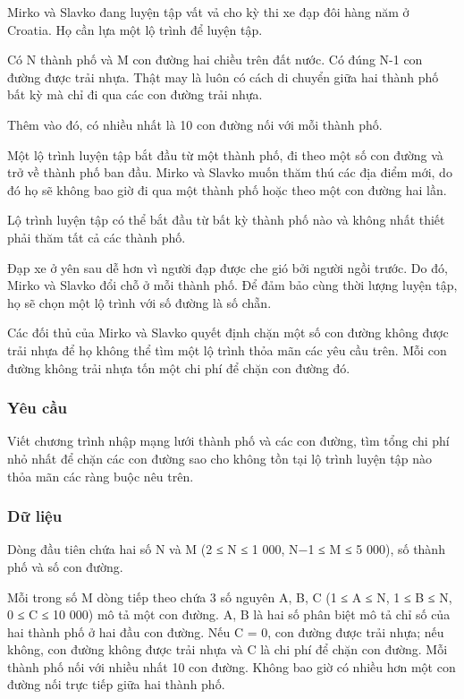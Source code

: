 



   Mirko và Slavko đang luyện tập vất vả cho kỳ thi xe đạp đôi hàng năm ở Croatia. Họ cần lựa một lộ trình để luyện tập.  

   Có N thành phố và M con đường hai chiều trên đất nước. Có đúng N-1 con đường được trải nhựa. Thật may là luôn có cách di chuyển giữa hai thành phố bất kỳ mà chỉ đi qua các con đường trải nhựa.  

   Thêm vào đó, có nhiều nhất là 10 con đường nối với mỗi thành phố.  

   Một lộ trình luyện tập bắt đầu từ một thành phố, đi theo một số con đường và trở về thành phố ban đầu. Mirko và Slavko muốn thăm thú các địa điểm mới, do đó họ sẽ không bao giờ đi qua một thành phố hoặc theo một con đường hai lần.  

   Lộ trình luyện tập có thể bắt đầu từ bất kỳ thành phố nào và không nhất thiết phải thăm tất cả các thành phố.  

   Đạp xe ở yên sau dễ hơn vì người đạp được che gió bởi người ngồi trước. Do đó, Mirko và Slavko đổi chỗ ở mỗi thành phố. Để đảm bảo cùng thời lượng luyện tập, họ sẽ chọn một lộ trình với số đường là số chẵn.  

   Các đối thủ của Mirko và Slavko quyết định chặn một số con đường không được trải nhựa để họ không thể tìm một lộ trình thỏa mãn các yêu cầu trên. Mỗi con đường không trải nhựa tốn một chi phí để chặn con đường đó.  

\subsubsection{   Yêu cầu  }

   Viết chương trình nhập mạng lưới thành phố và các con đường, tìm tổng chi phí nhỏ nhất để chặn các con đường sao cho không tồn tại lộ trình luyện tập nào thỏa mãn các ràng buộc nêu trên.  

\subsubsection{   Dữ liệu  }

   Dòng đầu tiên chứa hai số N và M (2 ≤ N ≤ 1 000, N−1 ≤ M ≤ 5 000), số thành phố và số con đường.  

   Mỗi trong số M dòng tiếp theo chứa 3 số nguyên A, B, C (1 ≤ A ≤ N, 1 ≤ B ≤ N, 0 ≤ C ≤ 10 000) mô tả một con đường. A, B là hai số phân biệt mô tả chỉ số của hai thành phố ở hai đầu con đường. Nếu C = 0, con đường được trải nhựa; nếu không, con đường không được trải nhựa và C là chi phí để chặn con đường. Mỗi thành phố nối với nhiều nhất 10 con đường. Không bao giờ có nhiều hơn một con đường nối trực tiếp giữa hai thành phố.  

